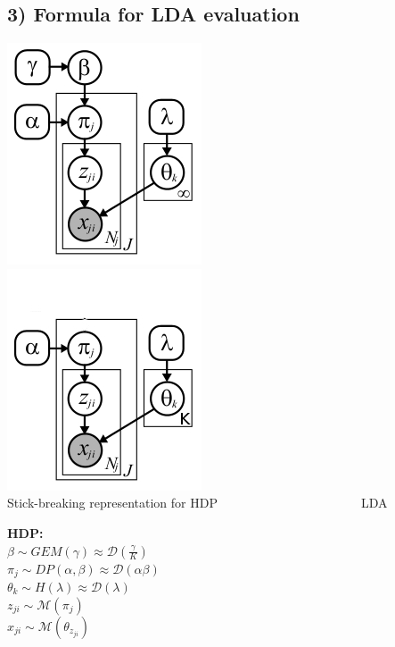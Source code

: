 \documentclass{article}
\begin{document}
\begin{spacing}{1.1}
\begin{enumerate}[(A)]
\section{3) Formula for LDA evaluation}
\begin{center}
\includegraphics{sb.jpg}\ \ \ \ \ \ \ \ \ \ \ \ \ \ \ \ \ \ \ \ \ \ \ \includegraphics{lda.jpg}\\
Stick-breaking representation for HDP\ \ \ \ \ \ \ \ \ \ \ \ \ \ \ \ \ \ \ \ \ \ \ LDA
\end{center}
\begin{table}[ht]
\begin{minipage}[b]{0.5\linewidth}
{\bf HDP:}\\
$\beta \sim GEM(\gamma)\approx\mathcal{D}(\frac{\gamma}{K})$\\
$\pi_{j} \sim DP(\alpha,\beta)\approx\mathcal{D}(\alpha\beta)$\\
$\theta_{k} \sim H(\lambda)\approx\mathcal{D}(\lambda)$\\
$z_{ji} \sim \mathcal{M}(\pi_{j})$\\
$x_{ji} \sim \mathcal{M}(\theta_{z_{ji}})$\\ 
\end{minipage}
\hspace{0.5cm}
\begin{minipage}[b]{0.5\linewidth}

\end{minipage}
\end{table}
\end{enumerate}
\end{spacing}
\end{document}
